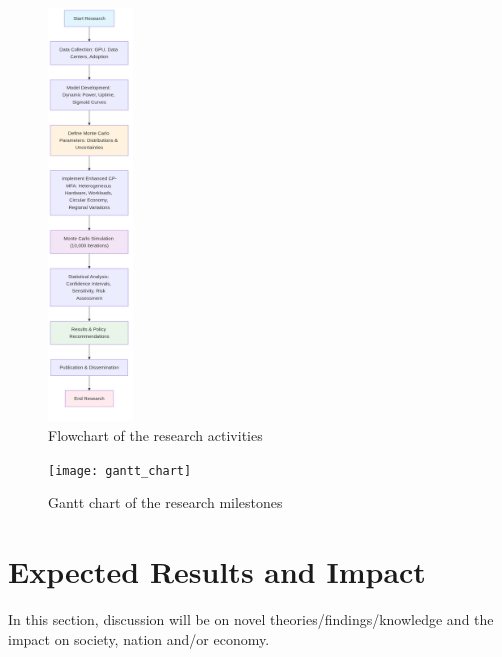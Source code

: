 \documentclass[a4paper, 12pt]{article}
\begin{document}
\begin{figure}[h]
    \begin{center}
        \includegraphics[width=0.2\textwidth]{flowchart}
    \end{center}
    \caption{Flowchart of the research activities}\label{fig:flowchart}
\end{figure}

\begin{figure}[ht]
    \begin{center}
        \texttt{[image: gantt\_chart]}
    \end{center}
    \caption{Gantt chart of the research milestones}\label{fig:gantt_chart}
\end{figure}

\section{Expected Results and Impact}
In this section, discussion will be on novel theories/findings/knowledge and the impact on society, nation and/or economy.

\printbibliography
\end{document}
